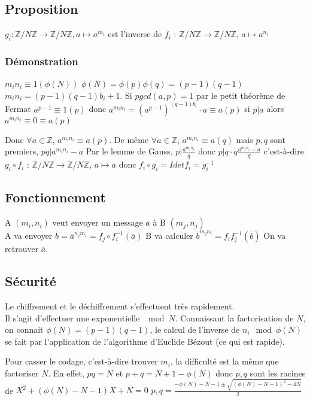 \documentclass[a4paper,10pt]{book} %
\newcommand{\Z}{\mathbb{Z}}
\begin{document}
\subsection{Proposition}
$g_i:\Z/N\Z\rightarrow \Z/N\Z, a\mapsto a^{m_i}$
est l'inverse de $f_i$ : $\Z/N\Z\rightarrow\Z/N\Z$, $a\mapsto a^{n_i}$

\subsubsection{Démonstration}
$m_in_i\equiv 1(\phi(N))$
$\phi(N)=\phi(p)\phi(q)=(p-1)(q-1)$
$m_in_i=(p-1)(q-1)b_i+1$.
Si $pgcd(a,p)=1$ par le petit théorème de Fermat $a^{p-1}\equiv 1(p)$ donc $a^{m_in_i}=(a^{p-1})^{(q-1)b_i}\cdot a\equiv a(p)$
si $p|a$ alors $a^{m_in_i}\equiv0\equiv a(p)$

Donc $\forall a\in \Z$, $a^{m_in_i}\equiv a(p)$. De même $\forall a\in \Z$, $a^{m_in_i}\equiv a(q)$
mais $p,q$ sont premiers, $pq|a^{m_in_i}-a$
Par le lemme de Gauss, $p| \frac{a^{m_in_i}}{q}$ donc $p|q\cdot q\frac{a^{m_in_i}-a}{q}$
c'est-à-dire $g_i\circ f_i$ : $\Z/N\Z \rightarrow \Z/N\Z$, $\overline{a}\mapsto \overline{a}$ donc $f_i\circ g_i=Id et f_i=g_i^{-1}$

\subsection{Fonctionnement}
A $(m_i,n_i)$ veut envoyer un message $\overline{a}$ à B $(m_j,n_j)$\\
A va envoyer $\overline{b}=\overline{a}^{n_jm_i}=f_j\circ f_i^{-1}(\overline{a})$
B va calculer $\overline{b}^{m_jn_i}=f_if_j^{-1}(\overline{b})$
On va retrouver $\overline{a}$.

\subsection{Sécurité}
Le chiffrement et le déchiffrement s'effectuent très rapidement.\\
Il s'agit d'effectuer une exponentielle $\mod N$.
Connaissant la factorisation de $N$, on connait $\phi(N)=(p-1)(q-1)$, le calcul de l'inverse de $n_i \mod \phi(N)$ se fait par l'application de l'algorithme d'Euclide Bézout (ce qui est rapide).

Pour casser le codage, c'est-à-dire trouver $m_i$, la difficulté est la même que factoriser $N$.
En effet, $pq=N$ et $p+q=N+1-\phi(N)$
donc $p,q$ sont les racines de $X^2+(\phi(N)-N-1)X+N=0$
$p,q=\frac{-\phi(N)-N-1\pm \sqrt{(\phi(N)-N-1)^2-4N}}{2}$
\end{document}
